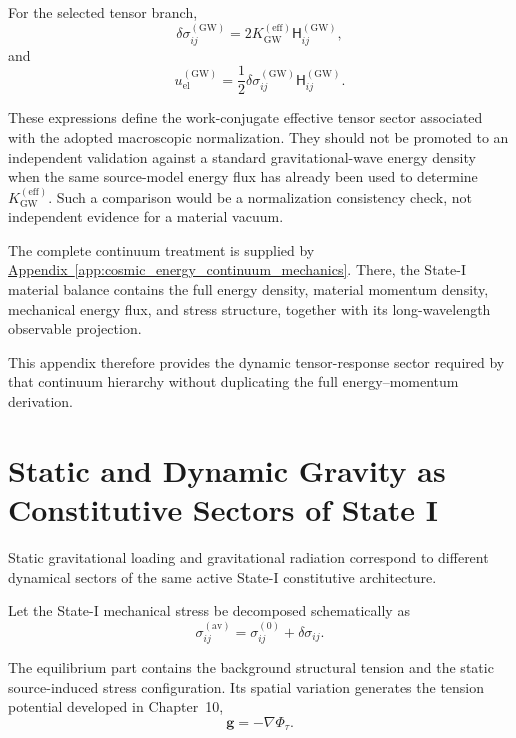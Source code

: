 For the selected tensor branch,
\begin{equation}
    \delta\sigma_{ij}^{(\mathrm{GW})} = 2K_{\mathrm{GW}}^{(\mathrm{eff})} \mathsf{H}_{ij}^{(\mathrm{GW})},
\end{equation}
and
\begin{equation}
    u_{\mathrm{el}}^{(\mathrm{GW})} = \frac{1}{2} \delta\sigma_{ij}^{(\mathrm{GW})} \mathsf{H}_{ij}^{(\mathrm{GW})}.
\end{equation}

These expressions define the work-conjugate effective tensor sector associated with the adopted macroscopic normalization. They should not be promoted to an independent validation against a standard gravitational-wave energy density when the same source-model energy flux has already been used to determine $K_{\mathrm{GW}}^{(\mathrm{eff})}$. Such a comparison would be a normalization consistency check, not independent evidence for a material vacuum.

The complete continuum treatment is supplied by \hyperref[app:cosmic_energy_continuum_mechanics]{Appendix~\ref*{app:cosmic_energy_continuum_mechanics}}. There, the State-I material balance contains the full energy density, material momentum density, mechanical energy flux, and stress structure, together with its long-wavelength observable projection.

This appendix therefore provides the dynamic tensor-response sector required by that continuum hierarchy without duplicating the full energy--momentum derivation.

\section{Static and Dynamic Gravity as Constitutive Sectors of State I}

Static gravitational loading and gravitational radiation correspond to different dynamical sectors of the same active State-I constitutive architecture.

Let the State-I mechanical stress be decomposed schematically as
\begin{equation}
    \sigma_{ij}^{(\mathrm{av})} = \sigma_{ij}^{(0)} + \delta\sigma_{ij}.
\end{equation}

The equilibrium part contains the background structural tension and the static source-induced stress configuration. Its spatial variation generates the tension potential developed in Chapter~10,
\begin{equation}
    \mathbf{g} = -\nabla\Phi_{\tau}.
\end{equation}

